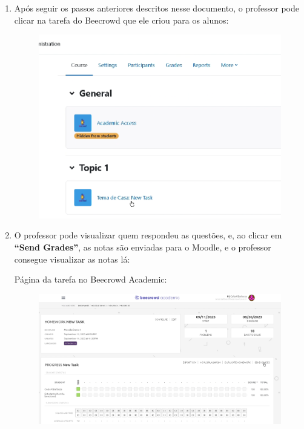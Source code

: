 \begin{enumerate}
    \item Após seguir os passos anteriores descritos nesse documento, o professor pode clicar na tarefa do Beecrowd que ele criou para os alunos:

    \begin{figure}[H]
        \centering
            \includegraphics[scale=0.35]{pictures/apendices/apendice_b_24.png}
    \end{figure}

    \item O professor pode visualizar quem respondeu as questões, e, ao clicar em \textbf{“Send Grades”}, as notas são enviadas para o Moodle, e o professor consegue visualizar as notas lá:

    Página da tarefa no Beecrowd Academic:

    \begin{figure}[H]
        \centering
            \includegraphics[scale=0.3]{pictures/apendices/apendice_b_25.png}
    \end{figure}


\end{enumerate}
